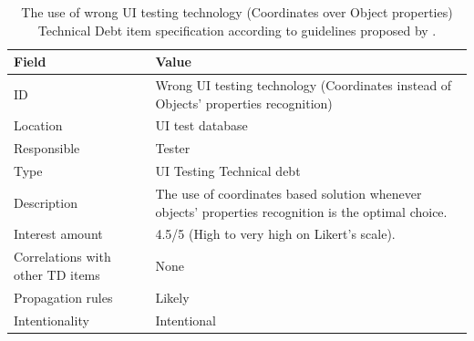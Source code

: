         \begin{table}[!htbp]
		\centering
		\tabulinesep=1.2mm
		\begin{tabu} to \textwidth {|X|X[3]|}

			\hline
			\textbf{Field} & \textbf{Value} \\
			\hline

			ID & Wrong UI testing technology (Coordinates instead of Objects' properties recognition)\\
			\hline

			Location & UI test database \\
			\hline

			Responsible & Tester \\
			\hline

			Type & UI Testing Technical debt \\
			\hline

			Description & The use of coordinates based solution whenever objects' properties recognition is the optimal choice.\\
			\hline



			Interest amount &  4.5/5 (High to very high on Likert's scale). \\
			\hline



			Correlations with other TD items & None\\
			\hline



			Propagation rules & Likely\\
			\hline

			Intentionality & Intentional \\
			\hline

		\end{tabu}
		\caption[Use of wrong UI testing technology - Coordinates over Objects' properties - TD item specification]{The use of wrong UI testing technology (Coordinates over Object properties) Technical Debt item specification according to guidelines proposed by \cite{mapping_study_td}.}
		\label{tab:res-coordinates-vs-property}
	\end{table}


